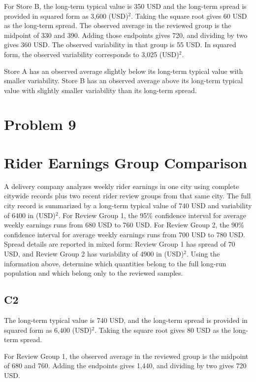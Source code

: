 \begin{ExamProblems}
		For Store B, the long-term typical value is 350 USD and the long-term spread is provided in squared form as 3,600 (USD)$^2$.
		Taking the square root gives 60 USD as the long-term spread.
		The observed average in the reviewed group is the midpoint of 330 and 390.
		Adding those endpoints gives 720, and dividing by two gives 360 USD.
		The observed variability in that group is 55 USD.
		In squared form, the observed variability corresponds to 3,025 (USD)$^2$.

		Store A has an observed average slightly below its long-term typical value with smaller variability.
		Store B has an observed average above its long-term typical value with slightly smaller variability than its long-term spread.


		\newpage
		\item
		\section{Problem 9}
		\section{Rider Earnings Group Comparison}
		A delivery company analyzes weekly rider earnings in one city using complete citywide records plus two recent rider review groups from that same city.
		The full city record is summarized by a long-term typical value of 740 USD and variability of 6400 in (USD)$^2$.
		For Review Group 1, the 95\% confidence interval for average weekly earnings runs from 680 USD to 760 USD.
		For Review Group 2, the 90\% confidence interval for average weekly earnings runs from 700 USD to 780 USD.
		Spread details are reported in mixed form: Review Group 1 has spread of 70 USD, and Review Group 2 has variability of 4900 in (USD)$^2$.
		Using the information above, determine which quantities belong to the full long-run population and which belong only to the reviewed samples.

\subsection*{C2}
		The long-term typical value is 740 USD, and the long-term spread is provided in squared form as 6,400 (USD)$^2$.
		Taking the square root gives 80 USD as the long-term spread.

		For Review Group 1, the observed average in the reviewed group is the midpoint of 680 and 760.
		Adding the endpoints gives 1,440, and dividing by two gives 720 USD.


\end{ExamProblems}
